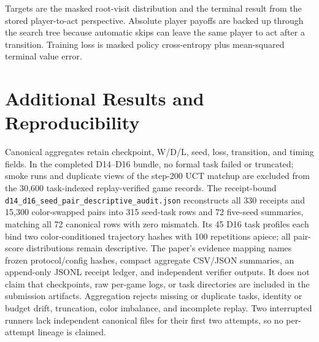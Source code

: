 \documentclass{article}
\begin{document}
Targets are the masked root-visit distribution and the terminal result from the
stored player-to-act perspective. Absolute player payoffs are backed up through
the search tree because automatic skips can leave the same player to act after
a transition. Training loss is masked policy cross-entropy plus mean-squared
terminal value error.

\section{Additional Results and Reproducibility}
\label{app:reproducibility}

Canonical aggregates retain checkpoint, W/D/L, seed, loss, transition, and
timing fields. In the completed D14--D16 bundle, no formal task failed or
truncated; smoke runs and duplicate
views of the step-200 UCT matchup are excluded from the 30,600 task-indexed
replay-verified game records. The receipt-bound
\texttt{d14\_d16\_seed\_pair\_descriptive\_audit.json} reconstructs all 330
receipts and 15,300 color-swapped pairs into 315 seed-task rows and 72 five-seed
summaries, matching all 72 canonical rows with zero mismatch. Its 45 D16 task
profiles each bind two color-conditioned trajectory hashes with 100 repetitions
apiece; all pair-score distributions remain descriptive. The paper's evidence
mapping names frozen
protocol/config hashes, compact aggregate CSV/JSON summaries, an append-only
JSONL receipt ledger, and independent verifier outputs. It does not claim that checkpoints, raw per-game logs, or
task directories are included in the submission artifacts.
Aggregation rejects missing or duplicate tasks, identity or budget drift,
truncation, color imbalance, and incomplete replay. Two interrupted runners
lack independent canonical files for their first two attempts, so no
per-attempt lineage is claimed.
\end{document}
